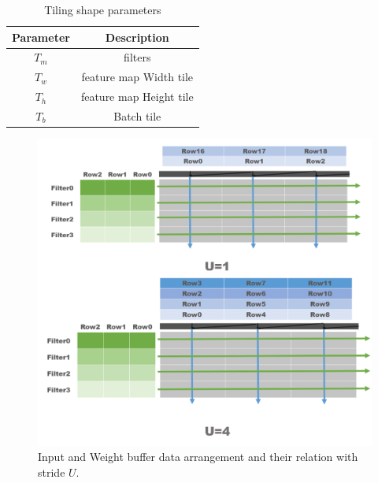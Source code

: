 \begin{table}[h]
    \caption{Tiling shape parameters}
    \label{tab:tile_shape}
    \centering
    \footnotesize 
        \begin{tabular}{cc}
        \toprule
        Parameter & Description \\
        \midrule
            $T_m$ & filters\\
            $T_w$ & feature map Width tile\\
            $T_h$ & feature map Height tile\\
            $T_b$ & Batch tile\\
        \bottomrule
        \end{tabular}
\end{table}
\begin{figure}[h]
    \centering
    \includegraphics[width=1\linewidth]{inc/4_proposed_architecture/figure/stride_buffer.png}
    \caption{Input and Weight buffer data arrangement and their relation with stride $U$.}
    \label{fig:stride_buffer}
\end{figure}
